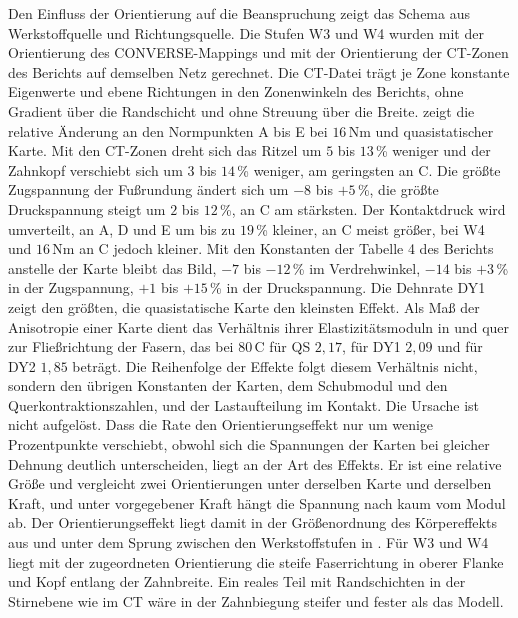 Den Einfluss der Orientierung auf die Beanspruchung zeigt das Schema aus Werkstoffquelle und Richtungsquelle. Die Stufen W3 und W4 wurden mit der Orientierung des CONVERSE-Mappings und mit der Orientierung der CT-Zonen des Berichts auf demselben Netz gerechnet. Die CT-Datei trägt je Zone konstante Eigenwerte und ebene Richtungen in den Zonenwinkeln des Berichts, ohne Gradient über die Randschicht und ohne Streuung über die Breite.  zeigt die relative Änderung an den Normpunkten A bis E bei $16$\,Nm und quasistatischer Karte. Mit den CT-Zonen dreht sich das Ritzel um $5$ bis $13$\,\% weniger und der Zahnkopf verschiebt sich um $3$ bis $14$\,\% weniger, am geringsten an C. Die größte Zugspannung der Fußrundung ändert sich um $-8$ bis $+5$\,\%, die größte Druckspannung steigt um $2$ bis $12$\,\%, an C am stärksten. Der Kontaktdruck wird umverteilt, an A, D und E um bis zu $19$\,\% kleiner, an C meist größer, bei W4 und $16$\,Nm an C jedoch kleiner. Mit den Konstanten der Tabelle 4 des Berichts anstelle der Karte bleibt das Bild, $-7$ bis $-12$\,\% im Verdrehwinkel, $-14$ bis $+3$\,\% in der Zugspannung, $+1$ bis $+15$\,\% in der Druckspannung. Die Dehnrate DY1 zeigt den größten, die quasistatische Karte den kleinsten Effekt. Als Maß der Anisotropie einer Karte dient das Verhältnis ihrer Elastizitätsmoduln in und quer zur Fließrichtung der Fasern, das bei $80$\,\textdegree C für QS $2{,}17$, für DY1 $2{,}09$ und für DY2 $1{,}85$ beträgt. Die Reihenfolge der Effekte folgt diesem Verhältnis nicht, sondern den übrigen Konstanten der Karten, dem Schubmodul und den Querkontraktionszahlen, und der Lastaufteilung im Kontakt. Die Ursache ist nicht aufgelöst. Dass die Rate den Orientierungseffekt nur um wenige Prozentpunkte verschiebt, obwohl sich die Spannungen der Karten bei gleicher Dehnung deutlich unterscheiden, liegt an der Art des Effekts. Er ist eine relative Größe und vergleicht zwei Orientierungen unter derselben Karte und derselben Kraft, und unter vorgegebener Kraft hängt die Spannung nach  kaum vom Modul ab. Der Orientierungseffekt liegt damit in der Größenordnung des Körpereffekts aus  und unter dem Sprung zwischen den Werkstoffstufen in . Für W3 und W4 liegt mit der zugeordneten Orientierung die steife Faserrichtung in oberer Flanke und Kopf entlang der Zahnbreite. Ein reales Teil mit Randschichten in der Stirnebene wie im CT wäre in der Zahnbiegung steifer und fester als das Modell.



